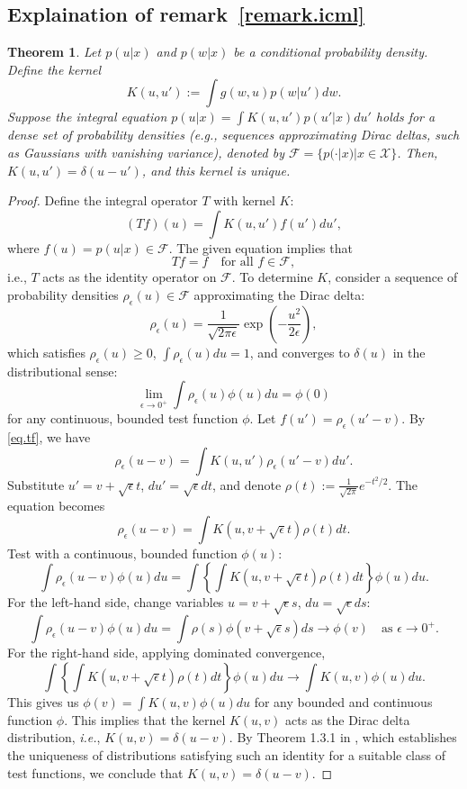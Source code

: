 \documentclass[
  12pt]{article}
\newtheorem{theorem}{Theorem}
\def\to{\rightarrow}
\begin{document}
\subsection{Explaination of remark~\ref{remark.icml}}
\label{sec.explain-remark-1}
\begin{theorem}\label{thm:kernel_identity}
Let $p(u|x)$ and $p(w|x)$ be a conditional probability density. Define the kernel
$$
K(u,u') := \int g(w,u)  p(w|u')  dw.
$$
Suppose the integral equation $p(u|x) = \int K(u, u') p(u'|x)  du'$ holds for a dense set of probability densities (\emph{e.g.}, sequences approximating Dirac deltas, such as Gaussians with vanishing variance), denoted by $\mathcal{F} = \{ p(\cdot|x) | x \in \mathcal{X} \} $. Then, $ K(u, u') = \delta(u - u') $, and this kernel is unique.
\end{theorem}
\begin{proof}
Define the integral operator $ T $ with kernel $ K $:
\begin{equation}
\label{eq.tf}
    (Tf)(u) = \int K(u, u') f(u')  du',
\end{equation}
where $ f(u) = p(u|x) \in \mathcal{F} $. The given equation implies that
$$
Tf = f \quad \text{for all } f \in \mathcal{F},
$$
i.e., $ T $ acts as the identity operator on $ \mathcal{F} $. To determine $K$, consider a sequence of probability densities $\rho_\epsilon(u) \in \mathcal{F}$ approximating the Dirac delta:
$$
\rho_\epsilon(u) = \frac{1}{\sqrt{2\pi \epsilon}} \exp\left( -\frac{u^2}{2\epsilon} \right),
$$
which satisfies $ \rho_\epsilon(u) \geq 0 $, $ \int\rho_\epsilon(u)  du = 1 $, and converges to $\delta(u)$ in the distributional sense:
$$
\lim_{\epsilon \to 0^+} \int \rho_\epsilon(u) \phi(u)  du = \phi(0)
$$
for any continuous, bounded test function $ \phi $. Let $ f(u') = \rho_\epsilon(u' - v) $. By \eqref{eq.tf}, we have
$$
\rho_\epsilon(u - v) = \int K(u, u') \rho_\epsilon(u' - v)  du'.
$$
Substitute $u' = v + \sqrt{\epsilon} t$, $du' = \sqrt{\epsilon} dt$, and denote $\rho(t) := \frac{1}{\sqrt{2\pi}} e^{-t^2/2}$. The equation becomes
$$
\rho_\epsilon(u - v) = \int K(u, v + \sqrt{\epsilon} t) \rho(t)  dt.
$$
Test with a continuous, bounded function $ \phi(u) $:
$$
\int \rho_\epsilon(u - v) \phi(u)  du = \int \left\{ \int K(u, v + \sqrt{\epsilon} t) \rho(t)  dt \right\} \phi(u)  du.
$$
For the left-hand side, change variables $u = v + \sqrt{\epsilon} s$, $du = \sqrt{\epsilon} ds$:
$$
\int \rho_\epsilon(u - v) \phi(u)  du = \int \rho(s) \phi(v + \sqrt{\epsilon} s)  ds \to \phi(v) \quad \text{as } \epsilon \to 0^+.
$$
For the right-hand side, applying dominated convergence,
$$
\int \left\{ \int K(u, v + \sqrt{\epsilon} t) \rho(t)  dt \right\} \phi(u)  du \to \int K(u, v) \phi(u)  du.
$$
This gives us
$\phi(v) = \int K(u, v) \phi(u)  du$ for any bounded and continuous function $\phi$. This implies that the kernel $K(u,v)$ acts as the Dirac delta distribution, \emph{i.e.}, $K(u,v)=\delta(u-v)$. By Theorem 1.3.1 in \cite{friedlander1998introduction}, which establishes the uniqueness of distributions satisfying such an identity for a suitable class of test functions, we conclude that $K(u,v)=\delta(u-v)$.
\end{proof}
\end{document}
